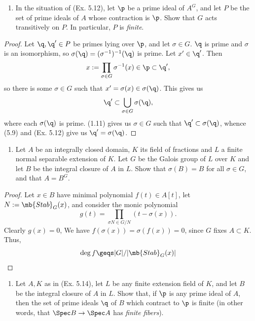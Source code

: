 \documentclass[12pt]{amsart}
\newcommand{\Stab}{\mb{Stab}}
\begin{document}
\begin{enumerate}
  \item[5.13] {
      In the situation of (Ex. 5.12), let $\p$ be a prime ideal of $A^G$, and let $P$ be the set of prime ideals of $A$ whose contraction is $\p$.
      Show that $G$ acts transitively on $P$.
      In particular, $P$ is \emph{finite}.
    }
\end{enumerate}

\begin{proof}
  Let $\q,\q'\in P$ be primes lying over $\p$, and let $\sigma\in G$.
  $\q$ is prime and $\sigma$ is an isomorphism, so $\sigma(\q)=(\sigma^{-1})^{-1}(\q)$ is prime.
  Let $x'\in \q'$.
  Then 
  \[
    x:=\prod_{\sigma\in G}\sigma^{-1}(x)\in \p\subset \q',
  \]
  so there is some $\sigma\in G$ such that $x'=\sigma(x)\in \sigma(\q)$.
  This gives us 
  \[
    \q'\subset \bigcup_{\sigma\in G}\sigma(\q),
  \]
  where each $\sigma(\q)$ is prime.
  (1.11) gives us $\sigma\in G$ such that $\q'\subset \sigma(\q)$, whence (5.9) and (Ex. 5.12) give us $\q'=\sigma(\q)$.
\end{proof}

\begin{enumerate}
  \item[5.14] {
      Let $A$ be an integrally closed domain, $K$ its field of fractions and $L$ a finite normal separable extension of $K$.
      Let $G$ be the Galois group of $L$ over $K$ and let $B$ be the integral closure of $A$ in $L$.
      Show that $\sigma(B)=B$ for all $\sigma\in G$, and that $A=B^G$.
    }
\end{enumerate}

\begin{proof}
  Let $x\in B$ have minimal polynomial $f(t)\in A[t]$, let $N:=\Stab_G(x)$, and consider the monic polynomial
  \[
    g(t)=\prod_{\sigma N\in G/N}(t-\sigma(x)).
  \] 
  Clearly $g(x)=0$,
  We have $f(\sigma(x))=\sigma(f(x))=0$, since $G$ fixes $A\subset K$.
  Thus, 
  \[
    \deg f\geqs |G|/|\Stab_G(x)|
  \]
\end{proof}

\begin{enumerate}
  \item[5.15] {
      Let $A,K$ as in (Ex. 5.14), let $L$ be any finite extension field of $K$, and let $B$ be the integral closure of $A$ in $L$.
      Show that, if $\p$ is any prime ideal of $A$, then the set of prime ideals $\q$ of $B$ which contract to $\p$ is finite (in other words, that $\Spec B\to \Spec A$ has \emph{finite fibers}).
    }
\end{enumerate}
\end{document}
